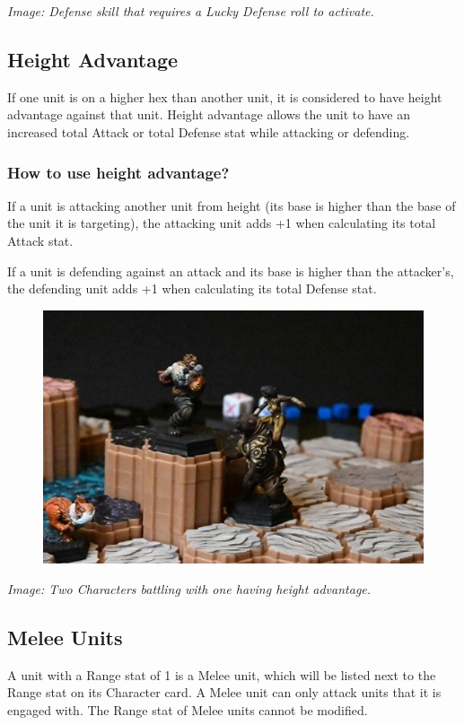 \documentclass[../main.tex]{subfiles}
\begin{document}
\textit{Image: Defense skill that requires a Lucky Defense roll to activate.}

\subsection{Height Advantage}
If one unit is on a higher hex than another unit, it is considered to have height advantage against that unit. Height advantage allows the unit to have an increased total Attack or total Defense stat while attacking or defending.

\subsubsection{How to use height advantage?}
If a unit is attacking another unit from height (its base is higher than the base of the unit it is targeting), the attacking unit adds +1 when calculating its total Attack stat.

If a unit is defending against an attack and its base is higher than the attacker’s, the defending unit adds +1 when calculating its total Defense stat.

\begin{figure}[h]
    \centering
    \includegraphics[width=0.75\linewidth]{chapters//TargetingandCombat/TimeStrikeHeightAdvantage.jpg}
\end{figure}

\textit{Image: Two Characters battling with one having height advantage.}

\subsection{Melee Units}
A unit with a Range stat of 1 is a Melee unit, which will be listed next to the Range stat on its Character card. A Melee unit can only attack units that it is engaged with. The Range stat of Melee units cannot be modified.
\end{document}
